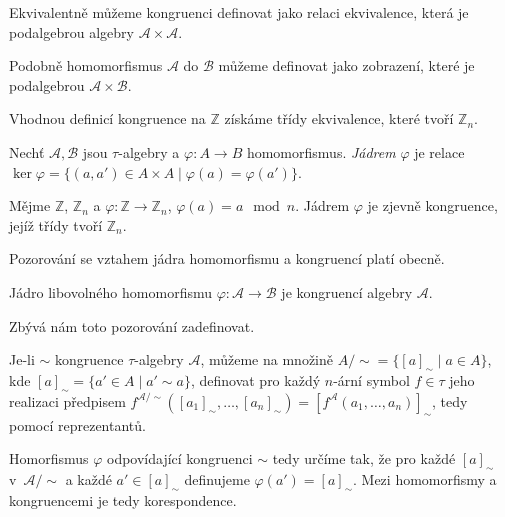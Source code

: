\begin{note}
    Ekvivalentně můžeme kongruenci definovat jako relaci ekvivalence,
    která je podalgebrou algebry $\mathcal{A} \times \mathcal{A}$.

    Podobně homomorfismus $\mathcal{A}$ do $\mathcal{B}$
    můžeme definovat jako zobrazení,
    které je podalgebrou $\mathcal{A} \times \mathcal{B}$.
\end{note}

\begin{definition}
    Vhodnou definicí kongruence na $\mathbb{Z}$ získáme
    třídy ekvivalence, které tvoří $\mathbb{Z}_n$.
\end{definition}

\begin{definition}
    Nechť $\mathcal{A}, \mathcal{B}$ jsou $\tau$-algebry
    a $\varphi : A \to B$ homomorfismus.
    {\em Jádrem} $\varphi$ je relace
    $\ker \varphi  = \{ (a, a') \in A \times A \mid \varphi(a) = \varphi(a') \}$.
\end{definition}

\begin{example}
    Mějme $\mathbb{Z}$, $\mathbb{Z}_n$ a
    $\varphi : \mathbb{Z} \to \mathbb{Z}_n$, $\varphi(a) = a \mod n$.
    Jádrem $\varphi$ je zjevně kongruence, jejíž třídy tvoří
    $\mathbb{Z}_n$.
\end{example}

Pozorování se vztahem jádra homomorfismu a kongruencí platí obecně.

\begin{claim}
    Jádro libovolného homomorfismu
    $\varphi : \mathcal{A} \to \mathcal{B}$
    je kongruencí algebry $\mathcal{A}$.
\end{claim}

Zbývá nám toto pozorování zadefinovat.

\begin{definition}
    Je-li $\sim$ kongruence $\tau$-algebry $\mathcal{A}$, můžeme na
    množině $A/{\sim} = \{ [a]_\sim \mid a \in A \}$,
    kde $[a]_\sim = \{ a' \in A \mid a' \sim a \}$,
    definovat pro každý $n$-ární symbol $f \in \tau$ jeho realizaci
    předpisem
    $f^{\mathcal{A}/{\sim}}([a_1]_\sim,\ldots,[a_n]_\sim)
    = [f^\mathcal{A}(a_1, \ldots, a_n)]_\sim$,
    tedy pomocí reprezentantů.
\end{definition}

Homorfismus $\varphi$ odpovídající kongruenci $\sim$ tedy určíme
tak, že pro každé $[a]_{\sim}$ v~$\mathcal{A}/{\sim}$
a každé $a' \in [a]_{\sim}$ definujeme
$\varphi(a') = [a]_{\sim}$.
Mezi homomorfismy a kongruencemi je tedy korespondence.


